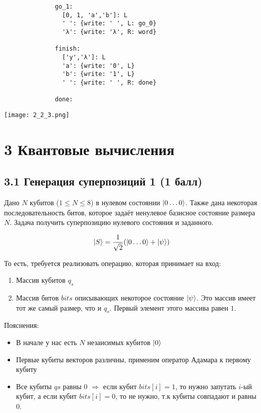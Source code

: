 \documentclass{article}
\DeclarePairedDelimiter\ket{\lvert}{\rangle}
\begin{document}
\begin{enumerate}
\begin{verbatim}
              go_1:
                [0, 1, 'a','b']: L
                ' ': {write: ' ', L: go_0}
                'λ': {write: 'λ', R: word}
              
              finish:
                ['y','λ']: L
                'a': {write: '0', L}
                'b': {write: '1', L}
                ' ': {write: ' ', R: done}
                
              done:

        \end{verbatim}
        \begin{center}
            \texttt{[image: 2\_2\_3.png]} \\
        \end{center}
\end{enumerate}


\section*{3 Квантовые вычисления}
\subsection*{3.1 Генерация суперпозиций 1 (1 балл)}
    Дано $N$ кубитов ($1 \le N \le 8$) в нулевом состоянии $\ket{0\dots0}$. 
    Также дана некоторая последовательность битов, которое задаёт ненулевое базисное состояние размера $N$. Задача получить суперпозицию нулевого состояния и заданного.
    
    $$\ket{S} = \frac{1}{\sqrt2}(\ket{0\dots0} +\ket{\psi})$$
    
    То есть, требуется реализовать операцию, которая принимает на вход:
    \begin{enumerate}
        \item Массив кубитов $q_s$
        \item Массив битов $bits$ описывающих некоторое состояние $\ket{\psi}$. Это массив имеет тот же самый размер, что и $q_s$. Первый элемент этого массива равен $1$.
    \end{enumerate}
    
    Пояснения:
        
    \begin{itemize}
        \item В начале у нас есть $N$ незаисимых кубитов $\ket{0}$
        \item Первые кубиты векторов различны, применим оператор Адамара к первому кубиту
        \item Все кубиты $qs$ равны 0 $\Rightarrow$ если кубит $bits[i] = 1$, то нужно запутать $i$-ый кубит, а если кубит $bits[i] = 0$, то не нужно, т.к кубиты совпадают и равны 0.

    \end{itemize}
    
\end{document}

